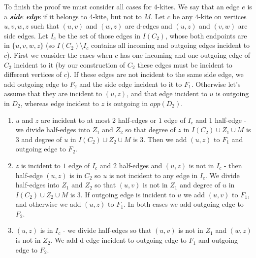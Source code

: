 \documentclass[a4, 11pt]{article}
\newcommand{\<}{\langle}
\renewcommand{\>}{\rangle}
\begin{document}
To finish the proof we must consider all cases for $4$-kites.
We say that an edge $e$ is a {\bf \em side edge} if it belongs to 4-kite, but not to $M$. Let $c$ be any $4$-kite on vertices $u,v,w,z$ such that $(u,v)$ and $(w,z)$ are d-edges and $(u,z)$ and $(v,w)$ are side edges. Let $I_c$ be the set of those edges in $I(C_2)$, whose both endpoints are in $\{u,v,w,z\}$ (so $I(C_2) \setminus I_c$ contains all incoming and outgoing edges incident to $c$). First we consider the cases when $c$ has one incoming and one outgoing edge of $C_2$ incident to it (by our construction of $C_2$ these edges must be incident to different vertices of $c$). If these edges are not incident to the same side edge, we add outgoing edge to $F_2$ and the side edge incident to it to $F_1$. Otherwise let's assume that they are incident to $(u,z)$, and that edge incident to $u$ is outgoing in $D_2$, whereas edge incident to $z$ is outgoing in $opp(D_2)$.
\begin{enumerate}
	\item $u$ and $z$ are incident to at most $2$ half-edges or $1$ edge of $I_c$ and $1$ half-edge - we divide half-edges into $Z_1$ and $Z_2$ so that degree of $z$ in $I(C_2) \cup Z_1 \cup M$ is 3 and degree of $u$ in $I(C_2) \cup Z_2 \cup M$ is 3. Then we add $(u,z)$ to $F_1$ and outgoing edge to $F_2$.
	\item $z$ is incident to $1$ edge of $I_c$ and $2$ half-edges and $(u,z)$ is not in $I_c$ - then half-edge $(u,z)$ is in $C_2$ so $u$ is not incident to any edge in $I_c$. We divide half-edges into $Z_1$ and $Z_2$ so that $(u,v)$ is not in $Z_1$ and degree of $u$ in $I(C_2) \cup Z_2 \cup M$ is 3. If outgoing edge is incident to $u$ we add $(u,v)$ to $F_1$, and otherwise we add $(u,z)$ to $F_1$. In both cases we add outgoing edge to $F_2$.
	\item $(u,z)$ is in $I_c$ - we divide half-edges so that $(u,v)$ is not in $Z_1$ and $(w,z)$ is not in $Z_2$. We add d-edge incident to outgoing edge to $F_1$ and outgoing edge to $F_2$.
\end{enumerate}
\end{document}
